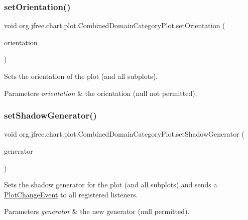 \subsubsection{\texorpdfstring{set\+Orientation()}{setOrientation()}}
{\footnotesize\ttfamily void org.\+jfree.\+chart.\+plot.\+Combined\+Domain\+Category\+Plot.\+set\+Orientation (\begin{DoxyParamCaption}\item[{\mbox{\hyperlink{classorg_1_1jfree_1_1chart_1_1plot_1_1_plot_orientation}{Plot\+Orientation}}}]{orientation }\end{DoxyParamCaption})}

Sets the orientation of the plot (and all subplots).


\begin{DoxyParams}{Parameters}
{\em orientation} & the orientation ({\ttfamily null} not permitted). \\
\hline
\end{DoxyParams}
\mbox{\label{classorg_1_1jfree_1_1chart_1_1plot_1_1_combined_domain_category_plot_a88690d6523bf4567257f06f131d9d90c}} 
\subsubsection{\texorpdfstring{set\+Shadow\+Generator()}{setShadowGenerator()}}
{\footnotesize\ttfamily void org.\+jfree.\+chart.\+plot.\+Combined\+Domain\+Category\+Plot.\+set\+Shadow\+Generator (\begin{DoxyParamCaption}\item[{\mbox{\hyperlink{interfaceorg_1_1jfree_1_1chart_1_1util_1_1_shadow_generator}{Shadow\+Generator}}}]{generator }\end{DoxyParamCaption})}

Sets the shadow generator for the plot (and all subplots) and sends a \mbox{\hyperlink{}{Plot\+Change\+Event}} to all registered listeners.


\begin{DoxyParams}{Parameters}
{\em generator} & the new generator ({\ttfamily null} permitted). \\
\hline
\end{DoxyParams}
\mbox{\label{classorg_1_1jfree_1_1chart_1_1plot_1_1_combined_domain_category_plot_a7518473f9d33ae6ee055e2045ff4faec}} 
